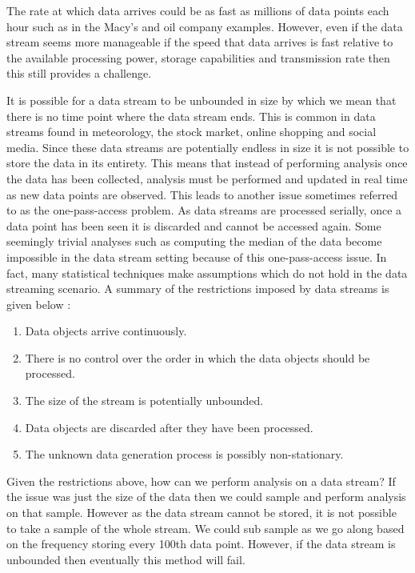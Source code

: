 

The rate at which data arrives could be as fast as millions of data points each hour such as in the Macy's and oil company examples. However, even if the data stream seems more manageable if the speed that data arrives is fast relative to the available processing power, storage capabilities and transmission rate then this still provides a challenge. %

 It is possible for a data stream to be unbounded in size by which we mean that there is no time point where the data stream ends.  This is common in data streams found in meteorology, the stock market, online shopping and social media. Since these data streams are potentially endless in size it is not possible to store the data in its entirety. This means that instead of performing analysis once the data has been collected, analysis must be performed and updated in real time as new data points are observed. This leads to another issue sometimes referred to as the one-pass-access problem. As data streams are processed serially, once a data point has been seen it is discarded and cannot be accessed again. Some seemingly trivial analyses such as computing the median of the data become impossible in the data stream setting because of this one-pass-access issue.  In fact, many statistical techniques make assumptions which do not hold in the data streaming scenario. A summary of the restrictions imposed by data streams is given below \citep{Silva2013}:

\begin{enumerate}
\item Data objects arrive continuously.
\item There is no control over the order in which the data objects should be processed.
\item The size of the stream is potentially unbounded.
\item Data objects are discarded after they have been processed.
\item The unknown data generation process is possibly non-stationary.
\end{enumerate}

Given the restrictions above, how can we perform analysis on a data stream? If the issue was just the size of the data then we could sample and perform analysis on that sample. However as the data stream cannot be stored, it is not possible to take a sample of the whole stream. We could sub sample as we go along based on the frequency storing every 100th data point. However, if the data stream is unbounded then eventually this method will fail.

